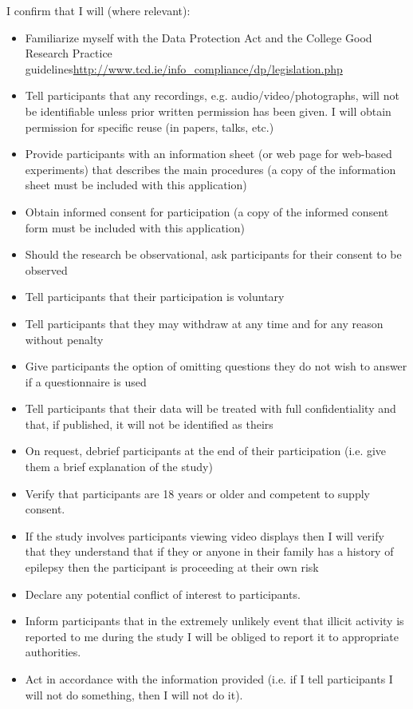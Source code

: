 I confirm that I will (where relevant):
\begin{itemize}
    \item Familiarize myself with the Data Protection Act and the College Good Research Practice guidelines\newline\url{http://www.tcd.ie/info_compliance/dp/legislation.php}
    \item Tell participants that any recordings, e.g. audio/video/photographs, will not be identifiable unless prior written permission has been given. I will obtain permission for specific reuse (in papers, talks, etc.)
    \item Provide participants with an information sheet (or web page for web-based experiments) that describes the main procedures (a copy of the information sheet must be included with this application)
    \item Obtain informed consent for participation (a copy of the informed consent form must be included with this application)
    \item Should the research be observational, ask participants for their consent to be observed
    \item Tell participants that their participation is voluntary
    \item Tell participants that they may withdraw at any time and for any reason without penalty
    \item Give participants the option of omitting questions they do not wish to answer if a questionnaire is used
    \item Tell participants that their data will be treated with full confidentiality and that, if published, it will not be identified as theirs
    \item On request, debrief participants at the end of their participation (i.e. give them a brief explanation of the study)
    \item Verify that participants are 18 years or older and competent to supply consent.
    \item If the study involves participants viewing video displays then I will verify that they understand that if they or anyone in their family has a history of epilepsy then the participant is proceeding at their own risk
    \item Declare any potential conflict of interest to participants.
    \item Inform participants that in the extremely unlikely event that illicit activity is reported to me during the study I will be obliged to report it to appropriate authorities.
    \item Act in accordance with the information provided (i.e. if I tell participants I will not do something, then I will not do it).
\end{itemize}

